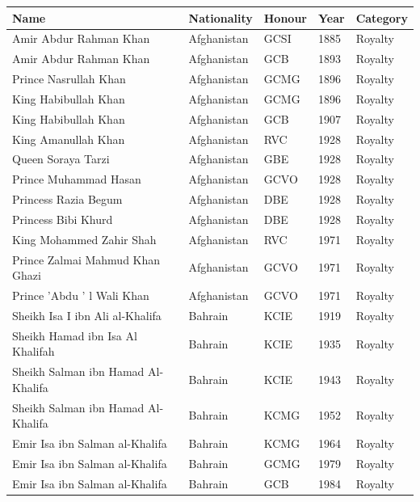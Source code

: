 \documentclass{article}
\begin{document}
\begin{tabular}{lllll}
\toprule
Name & Nationality & Honour & Year & Category \\
\midrule
Amir Abdur Rahman Khan & Afghanistan & GCSI & 1885 & Royalty \\
Amir Abdur Rahman Khan & Afghanistan & GCB & 1893 & Royalty \\
Prince Nasrullah Khan & Afghanistan & GCMG & 1896 & Royalty \\
King Habibullah Khan & Afghanistan & GCMG & 1896 & Royalty \\
King Habibullah Khan & Afghanistan & GCB & 1907 & Royalty \\
King Amanullah Khan & Afghanistan & RVC & 1928 & Royalty \\
Queen Soraya Tarzi & Afghanistan & GBE & 1928 & Royalty \\
Prince Muhammad Hasan & Afghanistan & GCVO & 1928 & Royalty \\
Princess Razia Begum & Afghanistan & DBE & 1928 & Royalty \\
Princess Bibi Khurd & Afghanistan & DBE & 1928 & Royalty \\
King Mohammed Zahir Shah & Afghanistan & RVC & 1971 & Royalty \\
Prince Zalmai Mahmud Khan Ghazi & Afghanistan & GCVO & 1971 & Royalty \\
Prince 'Abdu ' l Wali Khan & Afghanistan & GCVO & 1971 & Royalty \\
Sheikh Isa I ibn Ali al-Khalifa & Bahrain & KCIE & 1919 & Royalty \\
Sheikh Hamad ibn Isa Al Khalifah & Bahrain & KCIE & 1935 & Royalty \\
Sheikh Salman ibn Hamad Al-Khalifa & Bahrain & KCIE & 1943 & Royalty \\
Sheikh Salman ibn Hamad Al-Khalifa & Bahrain & KCMG & 1952 & Royalty \\
Emir Isa ibn Salman al-Khalifa & Bahrain & KCMG & 1964 & Royalty \\
Emir Isa ibn Salman al-Khalifa & Bahrain & GCMG & 1979 & Royalty \\
Emir Isa ibn Salman al-Khalifa & Bahrain & GCB & 1984 & Royalty \\
\bottomrule
\end{tabular}
\end{document}
